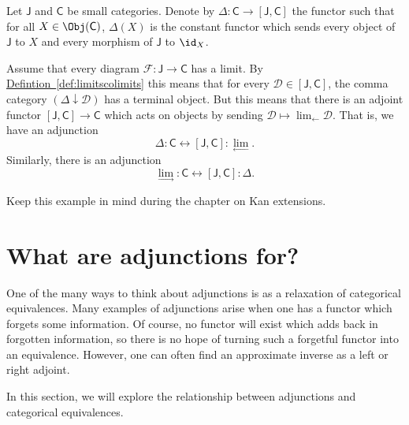 \documentclass[notes.tex]{subfiles}
\begin{document}
\begin{example}
  Let $\mathsf{J}$ and $\mathsf{C}$ be small categories. Denote by $\Delta\colon \mathsf{C} \to [\mathsf{J}, \mathsf{C}]$ the functor such that for all $X \in \Obj(\mathsf{C})$, $\Delta(X)$ is the constant functor which sends every object of $\mathsf{J}$ to $X$ and every morphism of $\mathsf{J}$ to $\id_{X}$.

  Assume that every diagram $\mathcal{F}\colon \mathsf{J} \to \mathsf{C}$ has a limit. By \hyperref[def:limitscolimits]{Defintion~\ref*{def:limitscolimits}} this means that for every $\mathcal{D} \in [\mathsf{J}, \mathsf{C}]$, the comma category $(\Delta \downarrow \mathcal{D})$ has a terminal object. But this means that there is an adjoint functor $[\mathsf{J}, \mathsf{C}] \to \mathsf{C}$ which acts on objects by sending $\mathcal{D} \mapsto \lim_{\leftarrow} \mathcal{D}$. That is, we have an adjunction
  \begin{equation*}
    \Delta : \mathsf{C} \leftrightarrow [\mathsf{J}, \mathsf{C}] : \lim_{\leftarrow}.
  \end{equation*}
  Similarly, there is an adjunction
  \begin{equation*}
    \lim_{\rightarrow} : \mathsf{C} \leftrightarrow [\mathsf{J}, \mathsf{C}] : \Delta.
  \end{equation*}
\end{example}

Keep this example in mind during the chapter on Kan extensions.

\section{What are adjunctions for?}
\label{sec:what_are_adjunctions_for}

One of the many ways to think about adjunctions is as a relaxation of categorical equivalences. Many examples of adjunctions arise when one has a functor which forgets some information. Of course, no functor will exist which adds back in forgotten information, so there is no hope of turning such a forgetful functor into an equivalence. However, one can often find an approximate inverse as a left or right adjoint.

In this section, we will explore the relationship between adjunctions and categorical equivalences.
\end{document}

